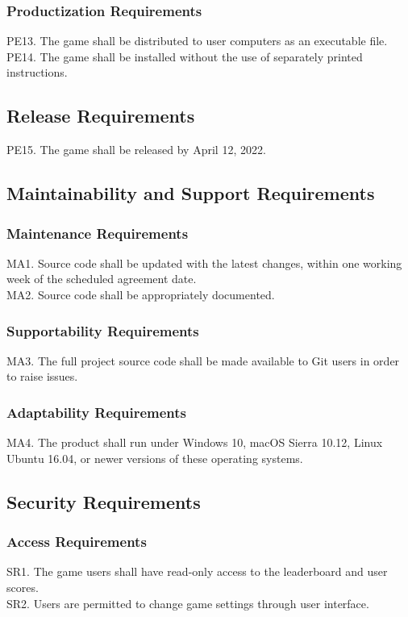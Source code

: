 \documentclass[12pt]{article}
\begin{document}
    \subsubsection{Productization Requirements}
    PE13. The game shall be distributed to user computers as an executable file.\\
    PE14. The game shall be installed without the use of separately printed instructions.
    
 \subsection{Release Requirements}
    PE15. The game shall be released by April 12, 2022.
    
 \subsection{Maintainability and Support Requirements}
    \subsubsection{Maintenance Requirements}
    MA1. Source code shall be updated with the latest changes, within one working week of the scheduled agreement date.\\
    MA2. Source code shall be appropriately documented.
    
    \subsubsection{Supportability Requirements}
    MA3. The full project source code shall be made available to Git users in order to raise issues.
    
    \subsubsection{Adaptability Requirements}
    MA4. The product shall run under Windows 10, macOS Sierra 10.12, Linux Ubuntu 16.04, or newer versions of these operating systems.
    
\subsection{Security Requirements}
    \subsubsection{Access Requirements}
    SR1. The game users shall have read-only access to the leaderboard and user scores. \\
    SR2. Users are permitted to change game settings through user interface.
    
\end{document}
